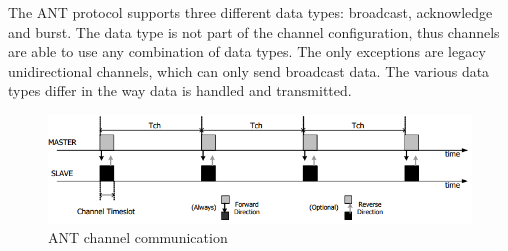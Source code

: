 The ANT protocol supports three different data types: broadcast, acknowledge and burst. The data type is not part of the channel configuration, thus channels are able to use any combination of data types. The only exceptions are legacy unidirectional channels, which can only send broadcast data. The various data types differ in the way data is handled and transmitted.
\begin{figure}[H]
	\centering
	\includegraphics[scale=.75]{content/images/ANTdataflow.png}
	\caption{ANT channel communication \cite{DynastreamInnovationsInc.2013}}\label{fig:antflow}
\end{figure}

